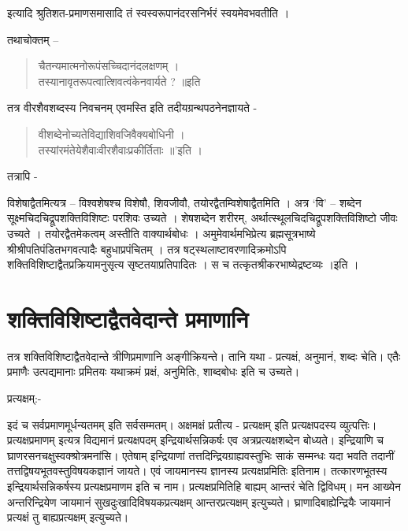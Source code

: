 इत्यादि श्रुतिशत-प्रमाणसमासादि तं स्वस्वरूपानंदरसनिर्भरं स्वयमेवभवतीति ।

तथाचोक्तम् –
\begin{verse}
चैतन्यमात्मनोरूपंसच्चिदानंदलक्षणम् ।\\
तस्यानावृतरूपत्वात्शिवत्वंकेनवार्यते ? ॥इति
\end{verse}
तत्र वीरशैवशब्दस्य निवचनम् एवमस्ति इति तदीयग्रन्थपठनेनज्ञायते -
\begin{verse}
वीशब्देनोच्यतेविद्याशिवजिवैक्यबोधिनी ।\\
तस्यांरमंतेयेशैवाःवीरशैवाःप्रकीर्तिताः ॥’इति ।
\end{verse}
तत्रापि -

विशेषाद्वैतमित्यत्र – विश्वशेषश्च विशेषौ, शिवजीवौ, तयोरद्वैतम्विशेषाद्वैतमिति । अत्र ‘वि’ – शब्देन सूक्ष्मचिदचिद्रूपशक्तिविशिष्टः परशिवः उच्यते । शेषशब्देन शरीरम्, अर्थात्स्थूलचिदचिद्रूपशक्तिविशिष्टो जीवः उच्यते । तयोरद्वैतमेकत्वम् अस्तीति वाक्यार्थबोधः । अमुमेवार्थमभिप्रेत्य ब्रह्मसूत्रभाष्ये श्रीश्रीपतिपंडितभगवत्पादैः बहुधाप्रपंचितम् । तत्र षट्स्थलाष्टावरणादिक्रमोऽपि शक्तिविशिष्टाद्वैतप्रक्रियामनुसृत्य सृष्टतयाप्रतिपादितः । स च तत्कृतश्रीकरभाष्येद्रष्टव्यः ।इति ।

\section*{शक्तिविशिष्टाद्वैतवेदान्ते प्रमाणानि}

तत्र शक्तिविशिष्टाद्वैतवेदान्ते त्रीणिप्रमाणानि अङ्गीक्रियन्ते। तानि यथा - प्रत्यक्षं, अनुमानं, शब्दः चेति। एतैः प्रमाणैः उत्पद्यमानाः प्रमितयः यथाक्रमं प्रक्षं, अनुमितिः, शाब्दबोधः इति च उच्यते।

प्रत्यक्षम्:-

इदं च सर्वप्रमाणमूर्धन्यतमम् इति सर्वसम्मतम्। अक्षमक्षं प्रतीत्य - प्रत्यक्षम् इति प्रत्यक्षपदस्य व्युत्पत्तिः। प्रत्यक्षप्रमाणम् इत्यत्र विद्यमानं प्रत्यक्षपदम् इन्द्रियार्थसन्निकर्षः एव अत्रप्रत्यक्षशब्देन बोध्यते। इन्द्रियाणि च घ्राणरसनचक्षुस्वक्श्रोत्रमनांसि। एतेषाम् इन्द्रियाणां तत्तदिन्द्रियग्राह्यवस्तुभिः साकं सम्मन्धः यदा भवति तदानीं तत्तद्विषयभूतवस्तुविषयकज्ञानं जायते। एवं जायमानस्य ज्ञानस्य प्रत्यक्षप्रमितिः इतिनाम। तत्कारणभूतस्य इन्द्रियार्थसन्निकर्षस्य प्रत्यक्षप्रमाणम इति च नाम। प्रत्यक्षप्रमितिहि बाह्यम् आन्तरं चेति द्विविधम्। मन आख्येन अन्तरिन्द्रियेण जायमानं सुखदुःखादिविषयकप्रत्यक्षम् आन्तरप्रत्यक्षम् इत्युच्यते। घ्राणादिबाह्येन्द्रियैः जायमानं प्रत्यक्षं तु बाह्यप्रत्यक्षम् इत्युच्यते।

